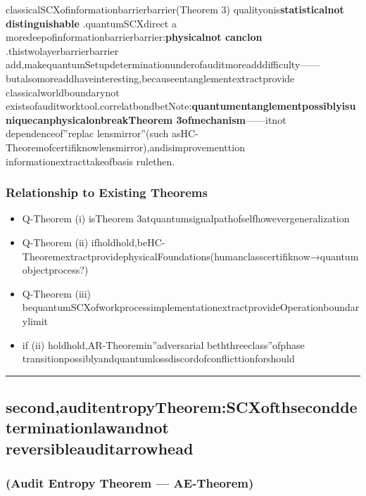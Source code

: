 \documentclass[
  12pt,
]{article}
\providecommand{\tightlist}{%
  \setlength{\itemsep}{0pt}\setlength{\parskip}{0pt}}
\begin{document}
classicalSCXofinformationbarrierbarrier(Theorem
3) qualityonis\textbf{statisticalnot distinguishable }.quantumSCXdirect  a  moredeepofinformationbarrierbarrier:\textbf{physicalnot canclon }.thistwolayerbarrierbarrier add,makequantumSetupdeterminationunderofauditmoreadddifficulty------butalsomoreaddhaveinteresting,becauseentanglementextractprovide classicalworldboundarynot existsofauditworktool.correlatbondbetNote:\textbf{quantumentanglementpossiblyisuniquecanphysicalonbreakTheorem
3ofmechanism}------itnot dependenceof''replac lensmirror''(such asHC-Theoremofcertifiknowlensmirror),andisimprovementtion informationextracttakeofbasis rulethen.

\subsubsection{Relationship to Existing Theorems}\label{ux4e0eux5df2ux6709ux5b9aux7406ux7684ux5173ux7cfb}

\begin{itemize}
\tightlist
\item
  Q-Theorem (i) isTheorem 3atquantumsignalpathofselfhowevergeneralization
\item
  Q-Theorem (ii)
  ifholdhold,beHC-TheoremextractprovidephysicalFoundations(humanclasscertifiknow→quantumobjectprocess?)
\item
  Q-Theorem (iii) bequantumSCXofworkprocessimplementationextractprovideOperationboundarylimit
\item
  if (ii)
  holdhold,AR-Theoremin''adversarial beththreeclass''ofphase transitionpossiblyandquantumlossdiscordofconflicttionforshould
\end{itemize}

\begin{center}\rule{0.5\linewidth}{0.5pt}\end{center}

\subsection{second,auditentropyTheorem:SCXofthseconddeterminationlawandnot reversibleauditarrowhead}\label{ux4e8cux5ba1ux8ba1ux71b5ux5b9aux7406scxux7684ux7b2cux4e8cux5b9aux5f8bux4e0eux4e0dux53efux9006ux5ba1ux8ba1ux7badux5934}

\subsubsection{(Audit Entropy Theorem ---
AE-Theorem)}\label{audit-entropy-theorem-ae-theorem}
\end{document}
